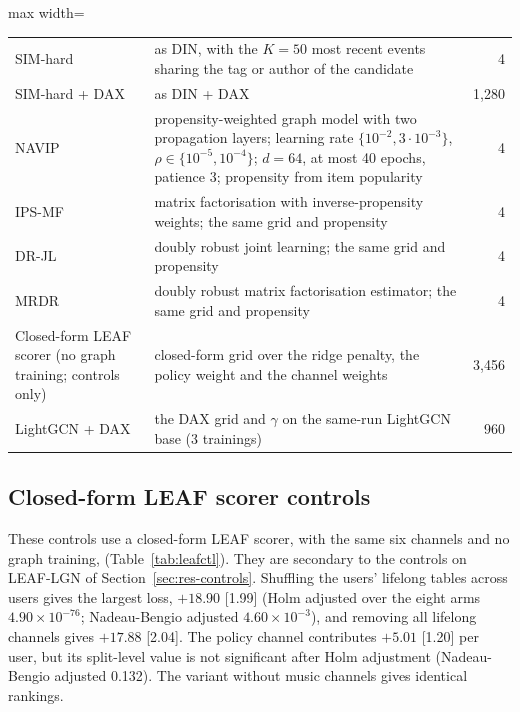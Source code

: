 \documentclass[preprint,12pt,authoryear]{elsarticle}
\begin{document}
\begin{table}[t]
\begin{adjustbox}{max width=\textwidth}
\begin{tabular}{p{}p{}r}
\raggedright SIM-hard \citep{pi2020sim} & \raggedright as DIN, with the $K=50$ most recent events sharing the tag or author of the candidate & 4 \\
\raggedright SIM-hard + DAX & \raggedright as DIN + DAX & 1,280 \\
\raggedright NAVIP \citep{kim2022navip} & \raggedright propensity-weighted graph model with two propagation layers; learning rate $\{10^{-2},3\cdot10^{-3}\}$, $\rho\in\{10^{-5},10^{-4}\}$; $d=64$, at most 40 epochs, patience 3; propensity from item popularity & 4 \\
\raggedright IPS-MF \citep{schnabel2016} & \raggedright matrix factorisation with inverse-propensity weights; the same grid and propensity & 4 \\
\raggedright DR-JL \citep{wang2019drjl} & \raggedright doubly robust joint learning; the same grid and propensity & 4 \\
\raggedright MRDR \citep{guo2021mrdr} & \raggedright doubly robust matrix factorisation estimator; the same grid and propensity & 4 \\
\raggedright Closed-form LEAF scorer (no graph training; controls only) & \raggedright closed-form grid over the ridge penalty, the policy weight and the channel weights & 3,456 \\
\raggedright LightGCN + DAX & \raggedright the DAX grid and $\gamma$ on the same-run LightGCN base (3 trainings) & 960 \\
\bottomrule
\end{tabular}
\end{adjustbox}
\end{table}

\subsection{Closed-form LEAF scorer controls}\label{app:leafctl}

These controls use a closed-form LEAF scorer, with the same six channels and no graph training, (Table~\ref{tab:leafctl}). They are secondary to the
controls on LEAF-LGN of Section~\ref{sec:res-controls}. Shuffling the users' lifelong tables across users gives the largest loss, $+18.90$ [1.99] (Holm
adjusted over the eight arms $4.90\times10^{-76}$; Nadeau-Bengio adjusted $4.60\times10^{-3}$), and removing all lifelong channels gives $+17.88$ [2.04]. The
policy channel contributes $+5.01$ [1.20] per user, but its split-level value is not significant after Holm adjustment (Nadeau-Bengio adjusted 0.132). The
variant without music channels gives identical rankings.
\end{document}
